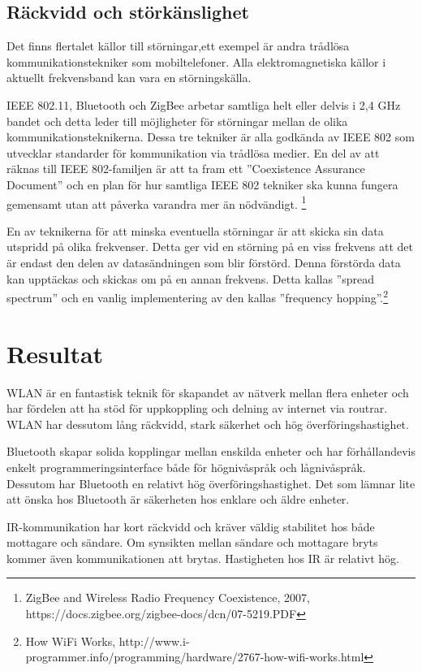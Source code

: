 \documentclass[a4paper,12pt,fleqn]{article}
\begin{document}
\subsection{Räckvidd och störkänslighet}

Det finns flertalet källor till störningar,ett exempel är andra trådlösa kommunikationstekniker som mobiltelefoner. Alla elektromagnetiska källor i aktuellt frekvensband kan vara en störningskälla.

IEEE 802.11, Bluetooth och ZigBee arbetar samtliga helt eller delvis i 2,4 GHz bandet och detta leder till möjligheter för störningar mellan de olika kommunikationsteknikerna. Dessa tre tekniker är alla godkända av IEEE 802 som utvecklar standarder för kommunikation via trådlösa medier. En del av att räknas till IEEE 802-familjen är att ta fram ett ''Coexistence Assurance Document'' och en plan för hur samtliga IEEE 802 tekniker ska kunna fungera gemensamt utan att påverka varandra mer än nödvändigt. 
\footnote{ZigBee and Wireless Radio
Frequency Coexistence, 2007, https://docs.zigbee.org/zigbee-docs/dcn/07-5219.PDF}

En av teknikerna för att minska eventuella störningar är att skicka sin data utspridd på olika frekvenser. Detta ger vid en störning på en viss frekvens att det är endast den delen av datasändningen som blir förstörd. Denna förstörda data kan upptäckas och skickas om på en annan frekvens. Detta kallas ''spread spectrum'' och en vanlig implementering av den kallas ''frequency hopping''.\footnote{
How WiFi Works, http://www.i-programmer.info/programming/hardware/2767-how-wifi-works.html}

\newpage

\section{Resultat}
WLAN är en fantastisk teknik för skapandet av nätverk mellan flera enheter och har fördelen att ha stöd för uppkoppling och delning av internet via routrar. WLAN har dessutom lång räckvidd, stark säkerhet och hög överföringshastighet.
  
Bluetooth skapar solida kopplingar mellan enskilda enheter och har förhållandevis enkelt programmeringsinterface både för högnivåspråk och lågnivåspråk. Dessutom har Bluetooth en relativt hög överföringshastighet. Det som lämnar lite att önska hos Bluetooth är säkerheten hos enklare och äldre enheter.

IR-kommunikation har kort räckvidd och kräver väldig stabilitet hos både mottagare och sändare. Om synsikten mellan sändare och mottagare bryts kommer även kommunikationen att brytas. Hastigheten hos IR är relativt hög. 
\end{document}
